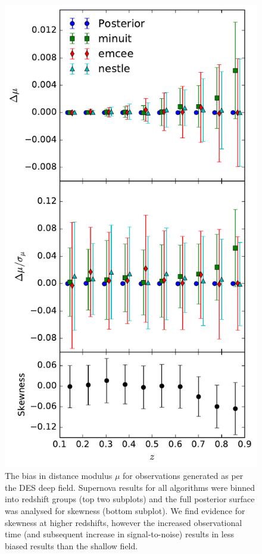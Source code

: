 \documentclass[a4paper,fleqn,usenatbib]{mnras}
\begin{document}
\begin{figure}
	\includegraphics[width=\columnwidth]{../output/bias_dessky_deep.pdf}
	\caption{The bias in distance modulus $\mu$ for observations generated as per the DES deep field. Supernova results for all algorithms were binned into redshift groups (top two subplots) and the full posterior surface was analysed for skewness (bottom subplot). We find evidence for skewness at higher redshifts, however the increased observational time (and subsequent increase in signal-to-noise) results in less biased results than the shallow field.}
	\label{fig:bias_des_deep}
\end{figure}
\end{document}
